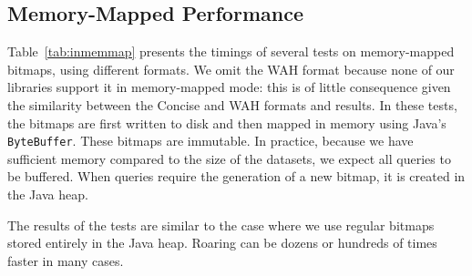 \documentclass[times]{speauth}
\begin{document}
\begin{table}
\end{table}




\subsection{Memory-Mapped Performance}

Table~\ref{tab:inmemmap} presents the timings of several
tests on memory-mapped bitmaps, using different formats.
We omit the WAH format because none of our libraries support
it in memory-mapped mode: this is of little consequence
given the similarity between the
Concise and WAH formats and results.
In
these tests, the bitmaps are first written
to disk and then mapped in memory using Java's \texttt{ByteBuffer}.
These bitmaps are immutable. In practice, because
we have sufficient memory compared to the size of the datasets,
we expect all queries to be buffered.
When queries require the generation of a new bitmap,
it is created in the Java heap.

The results of the tests are similar to the case where
we use regular bitmaps stored entirely in the Java heap.
Roaring can be dozens or hundreds of times faster in many cases. 
\end{document}
